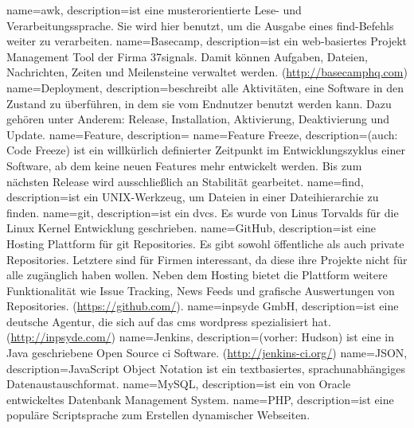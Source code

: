  {
  name=awk,
  description={ist eine musterorientierte Lese- und Verarbeitungssprache. Sie wird hier benutzt, um die Ausgabe eines \gls{find}-Befehls weiter zu verarbeiten. \cite{manpage_awk}}
}
 {
  name=Basecamp,
  description={ist ein web-basiertes Projekt Management Tool der Firma 37signals. Damit können Aufgaben, Dateien, Nachrichten, Zeiten und Meilensteine verwaltet werden. (\url{http://basecamphq.com})}
}
 {
  name=Deployment,
  description={beschreibt alle Aktivitäten, eine Software in den Zustand zu überführen, in dem sie vom Endnutzer benutzt werden kann. Dazu gehören unter Anderem: Release, Installation, Aktivierung, Deaktivierung und Update. \cite{deployment_tech}}
}
 {
  name=Feature,
  description={}
}
 {
  name=Feature Freeze,
  description={(auch: Code Freeze) ist ein willkürlich definierter Zeitpunkt im Entwicklungszyklus einer Software, ab dem keine neuen Features mehr entwickelt werden. Bis zum nächsten Release wird ausschließlich an Stabilität gearbeitet. \cite[S.298]{praxiswissen_softwareing}}
}
 {
  name=find,
  description={ist ein UNIX-Werkzeug, um Dateien in einer Dateihierarchie zu finden. \cite{manpage_find}}
}
 {
  name=git,
  description={ist ein \gls{dvcs}. Es wurde von Linus Torvalds für die Linux Kernel Entwicklung geschrieben.}
}
 {
  name=GitHub,
  description={ist eine Hosting Plattform für \gls{git} Repositories. Es gibt sowohl öffentliche als auch private Repositories. Letztere sind für Firmen interessant, da diese ihre Projekte nicht für alle zugänglich haben wollen. Neben dem Hosting bietet die Plattform weitere Funktionalität wie Issue Tracking, News Feeds und grafische Auswertungen von Repositories. (\url{https://github.com/})}.
}
 {
  name=inpsyde GmbH,
  description={ist eine deutsche Agentur, die sich auf das \gls{cms} \gls{wordpress} spezialisiert hat. (\url{http://inpsyde.com/})}
}
 {
  name=Jenkins,
  description={(vorher: Hudson) ist eine in Java geschriebene Open Source \gls{ci} Software. (\url{http://jenkins-ci.org/})}
}
 {
  name=JSON,
  description={JavaScript Object Notation ist ein textbasiertes, sprachunabhängiges Datenaustauschformat. \cite{json}}
}
 {
  name=MySQL,
  description={ist ein von Oracle entwickeltes Datenbank Management System.}
}
 {
  name=PHP,
  description={ist eine populäre Scriptsprache zum Erstellen dynamischer Webseiten.}
}
